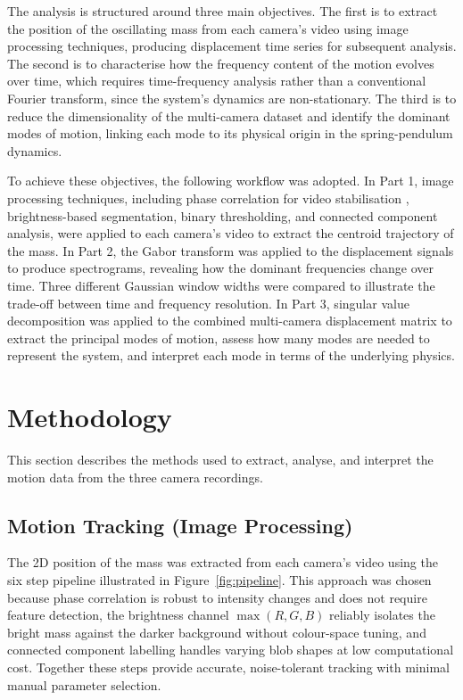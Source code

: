 \documentclass[12pt,a4paper]{article}
\begin{document}
The analysis is structured around three main objectives. The first is to extract the position of the oscillating mass from each camera's video using image processing techniques, producing displacement time series for subsequent analysis. The second is to characterise how the frequency content of the motion evolves over time, which requires time-frequency analysis rather than a conventional Fourier transform, since the system's dynamics are non-stationary. The third is to reduce the dimensionality of the multi-camera dataset and identify the dominant modes of motion, linking each mode to its physical origin in the spring-pendulum dynamics.

To achieve these objectives, the following workflow was adopted. In Part 1, image processing techniques, including phase correlation for video stabilisation \citep{kuglin1975}, brightness-based segmentation, binary thresholding, and connected component analysis, were applied to each camera's video to extract the centroid trajectory of the mass. In Part 2, the Gabor transform \citep{gabor1946} was applied to the displacement signals to produce spectrograms, revealing how the dominant frequencies change over time. Three different Gaussian window widths were compared to illustrate the trade-off between time and frequency resolution. In Part 3, singular value decomposition \citep{kutz2013} was applied to the combined multi-camera displacement matrix to extract the principal modes of motion, assess how many modes are needed to represent the system, and interpret each mode in terms of the underlying physics.



\section{Methodology}

This section describes the methods used to extract, analyse, and interpret the motion data from the three camera recordings.

\subsection{Motion Tracking (Image Processing)}

The 2D position of the mass was extracted from each camera's video using the six step pipeline illustrated in Figure~\ref{fig:pipeline}. This approach was chosen because phase correlation is robust to intensity changes and does not require feature detection, the brightness channel $\max(R,G,B)$ reliably isolates the bright mass against the darker background without colour-space tuning, and connected component labelling handles varying blob shapes at low computational cost. Together these steps provide accurate, noise-tolerant tracking with minimal manual parameter selection.
\end{document}
